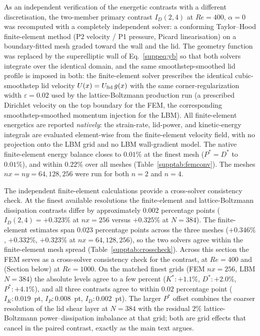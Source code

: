 As an independent verification of the energetic contrasts with a different discretisation, the two-member primary contrast $I_D(2,4)$ at $Re=400$, $\alpha=0$ was recomputed with a completely independent solver: a conforming Taylor--Hood finite-element method (P2 velocity / P1 pressure, Picard linearisation) on a boundary-fitted mesh graded toward the wall and the lid. The geometry function was replaced by the superelliptic wall of Eq.~\eqref{suppeq:yb} so that both solvers integrate over the identical domain, and the same smoothstep-smoothed lid profile is imposed in both: the finite-element solver prescribes the identical cubic-smoothstep lid velocity $U(x)=U_{\rm lid}\,g(x)$ with the same corner-regularization width $\varepsilon=0.02$ used by the lattice-Boltzmann production run (a prescribed Dirichlet velocity on the top boundary for the FEM, the corresponding smoothstep-smoothed momentum injection for the LBM). All finite-element energetics are reported \emph{natively}: the strain-rate, lid-power, and kinetic-energy integrals are evaluated element-wise from the finite-element velocity field, with no projection onto the LBM grid and no LBM wall-gradient model. The native finite-element energy balance closes to $0.01\%$ at the finest mesh ($P^*=D^*$ to $0.01\%$), and within $0.22\%$ over all meshes (Table~\ref{supptab:femconv}). The meshes $nx=ny=64,128,256$ were run for both $n=2$ and $n=4$.

The independent finite-element calculations provide a cross-solver consistency check. At the finest available resolutions the finite-element and lattice-Boltzmann dissipation contrasts differ by approximately $0.002$ percentage points ($I_D(2,4)=+0.323\%$ at $nx=256$ versus $+0.325\%$ at $N=384$). The finite-element estimates span $0.023$ percentage points across the three meshes ($+0.346\%$, $+0.332\%$, $+0.323\%$ at $nx=64,128,256$), so the two solvers agree within the finite-element mesh spread (Table~\ref{supptab:crosscheck}). Across this section the FEM serves as a cross-solver consistency check for the contrast, at $Re=400$ and (Section below) at $Re=1000$. On the matched finest grids (FEM $nx=256$, LBM $N=384$) the absolute levels agree to a few percent ($K^*: +1.1\%$, $D^*: +2.0\%$, $P^*: +4.1\%$), and all three contrasts agree to within $0.02$ percentage point ($I_K: 0.019$~pt, $I_P: 0.008$~pt, $I_D: 0.002$~pt). The larger $P^*$ offset combines the coarser resolution of the lid shear layer at $N=384$ with the residual $2\%$ lattice-Boltzmann power--dissipation imbalance at that grid; both are grid effects that cancel in the paired contrast, exactly as the main text argues.

